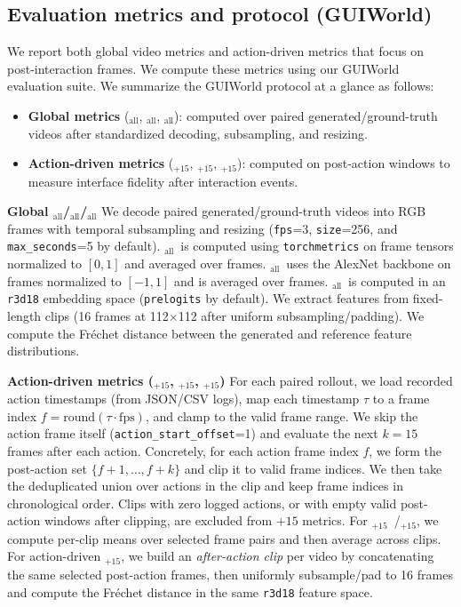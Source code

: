 \subsection{Evaluation metrics and protocol (GUIWorld)}
\label{appendix:gui-metrics}
We report both global video metrics and action-driven metrics that focus on post-interaction frames. 
We compute these metrics using our GUIWorld evaluation suite.
We summarize the GUIWorld protocol at a glance as follows:
\begin{tcolorbox}[
  colback=metablue!8,
  colframe=metablue!40,
  boxrule=0pt,
  borderline west={1pt}{0pt}{gray!60},
  left=6pt,right=4pt,top=3pt,bottom=3pt]
\small
\begin{itemize}
  \setlength{\itemsep}{2pt}
  \setlength{\topsep}{2pt}
  \item \textbf{Global metrics} (\FVD$_\text{all}$, \SSIM$_\text{all}$, \LPIPS$_\text{all}$): computed over paired generated/ground-truth videos after standardized decoding, subsampling, and resizing.
  \item \textbf{Action-driven metrics} (\SSIM$_{+15}$, \LPIPS$_{+15}$, \FVD$_{+15}$): computed on post-action windows to measure interface fidelity after interaction events.
\end{itemize}
\end{tcolorbox}

\noindent\textbf{Global \FVD$_\text{all}$/\SSIM$_\text{all}$/\LPIPS$_\text{all}$}
We decode paired generated/ground-truth videos into RGB frames with temporal subsampling and resizing (\texttt{fps}=3, \texttt{size}=256, and \texttt{max\_seconds}=5 by default).
\SSIM$_\text{all}$~is computed using \texttt{torchmetrics} on frame tensors normalized to $[0,1]$ and averaged over frames.
\LPIPS$_\text{all}$~uses the AlexNet backbone on frames normalized to $[-1,1]$ and is averaged over frames.
\FVD$_\text{all}$~is computed in an \texttt{r3d18} embedding space (\texttt{prelogits} by default).
We extract features from fixed-length clips (16 frames at 112$\times$112 after uniform subsampling/padding).
We compute the Fr\'echet distance between the generated and reference feature distributions.

\noindent\textbf{Action-driven metrics (\SSIM$_{+15}$, \LPIPS$_{+15}$, \FVD$_{+15}$)}
For each paired rollout, we load recorded action timestamps (from JSON/CSV logs), map each timestamp $\tau$ to a frame index $f=\mathrm{round}(\tau \cdot \mathrm{fps})$, and clamp to the valid frame range.
We skip the action frame itself (\texttt{action\_start\_offset}=1) and evaluate the next $k{=}15$ frames after each action.
Concretely, for each action frame index $f$, we form the post-action set $\{f+1,\dots,f+k\}$ and clip it to valid frame indices.
We then take the deduplicated union over actions in the clip and keep frame indices in chronological order.
Clips with zero logged actions, or with empty valid post-action windows after clipping, are excluded from $+15$ metrics.
For \SSIM$_{+15}$~/\LPIPS$_{+15}$, we compute per-clip means over selected frame pairs and then average across clips.
For action-driven \FVD$_{+15}$, we build an \emph{after-action clip} per video by concatenating the same selected post-action frames, then uniformly subsample/pad to 16 frames and compute the Fr\'echet distance in the same \texttt{r3d18} feature space.
